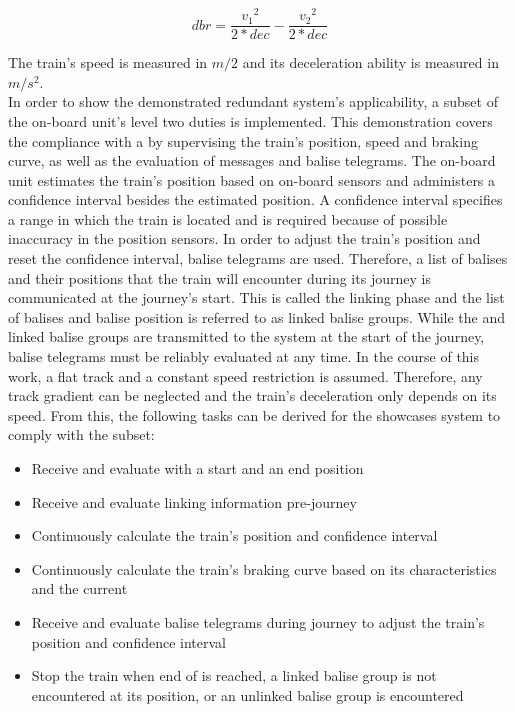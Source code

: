 \begin{equation}
dbr = \frac{{v_1}^2}{2*dec} - \frac{{v_2}^2}{2*dec}
\end{equation}

The train's speed is measured in $m/2$ and its deceleration ability is measured in $m/s^2$.
\\

In order to show the demonstrated redundant system's applicability, a subset of the on-board unit's  level two duties is implemented.
This demonstration covers the compliance with a  by supervising the train's position, speed and braking curve, as well as the evaluation of  messages and balise telegrams.
The on-board unit estimates the train's position based on on-board sensors and administers a confidence interval besides the estimated position.
A confidence interval specifies a range in which the train is located and is required because of possible inaccuracy in the position sensors.
In order to adjust the train's position and reset the confidence interval, balise telegrams are used.
Therefore, a list of balises and their positions that the train will encounter during its journey is communicated at the journey's start.
This is called the linking phase and the list of balises and balise position is referred to as linked balise groups.
While the  and linked balise groups are transmitted to the system at the start of the journey, balise telegrams must be reliably evaluated at any time.
In the course of this work, a flat track and a constant speed restriction is assumed.
Therefore, any track gradient can be neglected and the train's deceleration only depends on its speed.
From this, the following tasks can be derived for the showcases system to comply with the  subset:

\begin{itemize}
\item Receive and evaluate  with a start and an end position
\item Receive and evaluate linking information pre-journey
\item Continuously calculate the train's position and confidence interval
\item Continuously calculate the train's braking curve based on its characteristics and the current 
\item Receive and evaluate balise telegrams during journey to adjust the train's position and confidence interval
\item Stop the train when end of  is reached, a linked balise group is not encountered at its position, or an unlinked balise group is encountered
\end{itemize}

